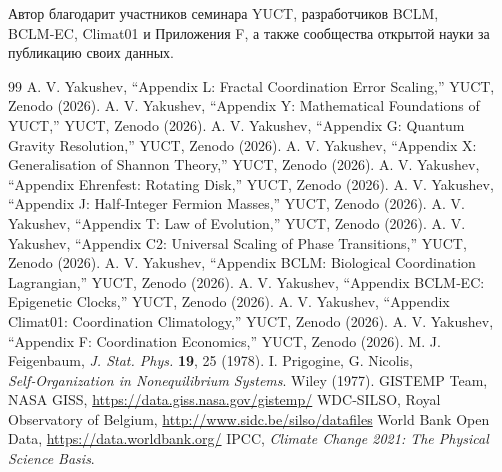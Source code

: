 \documentclass[12pt,a4paper]{article}
\begin{document}
	Автор благодарит участников семинара YUCT, разработчиков BCLM, BCLM‑EC, Climat01 и Приложения F,
	а также сообщества открытой науки за публикацию своих данных.
	
	\begin{thebibliography}{99}
		 A. V. Yakushev, ``Appendix L: Fractal Coordination Error Scaling,'' YUCT, Zenodo (2026).
		 A. V. Yakushev, ``Appendix Y: Mathematical Foundations of YUCT,'' YUCT, Zenodo (2026).
		 A. V. Yakushev, ``Appendix G: Quantum Gravity Resolution,'' YUCT, Zenodo (2026).
		 A. V. Yakushev, ``Appendix X: Generalisation of Shannon Theory,'' YUCT, Zenodo (2026).
		 A. V. Yakushev, ``Appendix Ehrenfest: Rotating Disk,'' YUCT, Zenodo (2026).
		 A. V. Yakushev, ``Appendix J: Half‑Integer Fermion Masses,'' YUCT, Zenodo (2026).
		 A. V. Yakushev, ``Appendix T: Law of Evolution,'' YUCT, Zenodo (2026).
		 A. V. Yakushev, ``Appendix C2: Universal Scaling of Phase Transitions,'' YUCT, Zenodo (2026).
		 A. V. Yakushev, ``Appendix BCLM: Biological Coordination Lagrangian,'' YUCT, Zenodo (2026).
		 A. V. Yakushev, ``Appendix BCLM‑EC: Epigenetic Clocks,'' YUCT, Zenodo (2026).
		 A. V. Yakushev, ``Appendix Climat01: Coordination Climatology,'' YUCT, Zenodo (2026).
		 A. V. Yakushev, ``Appendix F: Coordination Economics,'' YUCT, Zenodo (2026).
		 M. J. Feigenbaum, \emph{J. Stat. Phys.} \textbf{19}, 25 (1978).
		 I. Prigogine, G. Nicolis, \emph{Self‑Organization in Nonequilibrium Systems}. Wiley (1977).
		 GISTEMP Team, NASA GISS, \url{https://data.giss.nasa.gov/gistemp/}
		 WDC‑SILSO, Royal Observatory of Belgium, \url{http://www.sidc.be/silso/datafiles}
		 World Bank Open Data, \url{https://data.worldbank.org/}
		 IPCC, \emph{Climate Change 2021: The Physical Science Basis}.
	\end{thebibliography}
	
\end{document}
